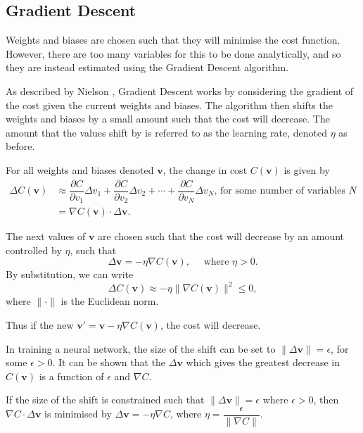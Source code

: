 \subsection{Gradient Descent}\label{nnets-graddesc}

Weights and biases are chosen such that they will minimise the cost function. However, there are too many variables for this to be done analytically, and so they are instead estimated using the Gradient Descent algorithm.

As described by Nielson \cite{Nielson2015}, Gradient Descent works by considering the gradient of the cost given the current weights and biases. The algorithm then shifts the weights and biases by a small amount such that the cost will decrease. The amount that the values shift by is referred to as the learning rate, denoted $\eta$ as before.

For all weights and biases denoted $\mathbf{v}$, the change in cost $C(\mathbf{v})$ is given by
\begin{align*}
	\Delta C(\mathbf{v}) & \approx \dfrac{\partial C}{\partial v_1}\Delta v_1 + \dfrac{\partial C}{\partial v_2}\Delta v_2 + \cdots + \dfrac{\partial C}{\partial v_N}\Delta v_N\text{, for some number of variables } N\\
	& = \nabla C(\mathbf{v})\cdot \Delta \mathbf{v}.
\end{align*}

The next values of $\mathbf{v}$ are chosen such that the cost will decrease by an amount controlled by $\eta$, such that
\[
	\Delta\mathbf{v} = -\eta \nabla C(\mathbf{v}), \quad \text{ where }\eta > 0.
\]
By substitution, we can write
\[
	\Delta C(\mathbf{v}) \approx -\eta \|\nabla C(\mathbf{v})\|^2 \le 0,
\]
where $\|\cdot\|$ is the Euclidean norm.

Thus if the new $\mathbf{v}' = \mathbf{v} - \eta \nabla C(\mathbf{v})$, the cost will decrease.

In training a neural network, the size of the shift can be set to $\|\Delta\mathbf{v}\| = \epsilon$, for some $\epsilon > 0$. It can be shown that the $\Delta\mathbf{v}$ which gives the greatest decrease in $C(\mathbf{v})$ is a function of $\epsilon$ and $\nabla C$.

\begin{proposition}\label{nnets-graddescminproof}
	If the size of the shift is constrained such that $\|\Delta\mathbf{v}\| = \epsilon$ where $\epsilon > 0$, then $\nabla C \cdot \Delta\mathbf{v}$ is minimised by $\Delta\mathbf{v} = -\eta\nabla C$, where $\eta = \dfrac{\epsilon}{\|\nabla C\|}$.
\end{proposition}

